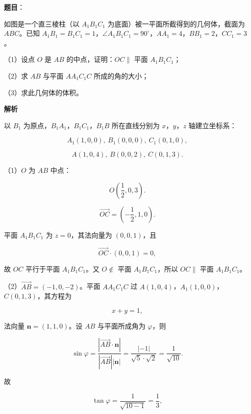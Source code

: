 \begin{answer}

\textbf{题目}：

如图是一个直三棱柱（以 $A_1B_1C_1$ 为底面）被一平面所截得到的几何体，截面为 $ABC$。已知 $A_1B_1=B_1C_1=1$，$\angle A_1B_1C_1=90^\circ$，$AA_1=4$，$BB_1=2$，$CC_1=3$。

（1）设点 $O$ 是 $AB$ 的中点，证明：$OC\parallel$ 平面 $A_1B_1C_1$；

（2）求 $AB$ 与平面 $AA_1C_1C$ 所成的角的大小；

（3）求此几何体的体积。
\nopagebreak[4]
\begin{center}\end{center}
\nopagebreak[4]
\textbf{解析}

以 $B_1$ 为原点，$B_1A_1$，$B_1C_1$，$B_1B$ 所在直线分别为 $x$，$y$，$z$ 轴建立坐标系：

\nopagebreak[4]
\[A_1(1,0,0),\ B_1(0,0,0),\ C_1(0,1,0),\]

\nopagebreak[4]
\[A(1,0,4),\ B(0,0,2),\ C(0,1,3).\]

（1）$O$ 为 $AB$ 中点：

\nopagebreak[4]
\[O\left(\frac12,0,3\right).\]

\nopagebreak[4]
\[\overrightarrow{OC}=\left(-\frac12,1,0\right).\]

平面 $A_1B_1C_1$ 为 $z=0$，其法向量为 $(0,0,1)$，且

\nopagebreak[4]
\[\overrightarrow{OC}\cdot(0,0,1)=0,\]

故 $OC$ 平行于平面 $A_1B_1C_1$。又 $O\notin$ 平面 $A_1B_1C_1$，所以 $OC\parallel$ 平面 $A_1B_1C_1$。

（2）$\overrightarrow{AB}=(-1,0,-2)$。平面 $AA_1C_1C$ 过 $A(1,0,4)$，$A_1(1,0,0)$，$C(0,1,3)$，其方程为

\nopagebreak[4]
\[x+y=1,\]

法向量 $\boldsymbol n=(1,1,0)$。设 $AB$ 与平面所成角为 $\varphi$，则

\nopagebreak[4]
\[\sin\varphi=\frac{|\overrightarrow{AB}\cdot\boldsymbol n|}{|\overrightarrow{AB}||\boldsymbol n|}=\frac{|-1|}{\sqrt5\cdot\sqrt2}=\frac1{\sqrt{10}}.\]

故

\nopagebreak[4]
\[\tan\varphi=\frac1{\sqrt{10-1}}=\frac13,\]


\end{answer}
